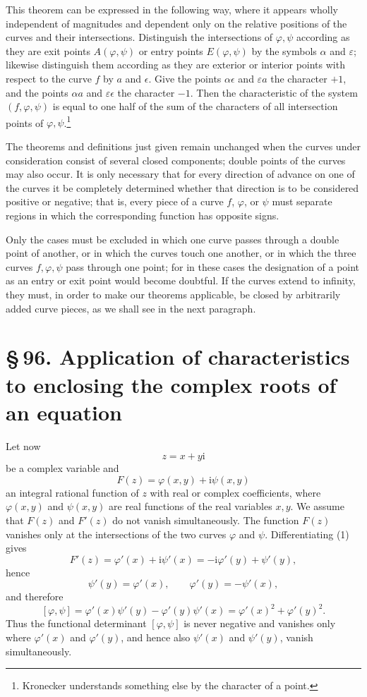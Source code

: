 \documentclass[11pt]{article}
\providecommand{\ii}{\mathrm{i}}
\providecommand{\sect}[2]{\section*{\S\,#1. #2}}
\begin{document}
This theorem can be expressed in the following way, where it appears wholly independent of magnitudes and dependent only on the relative positions of the curves and their intersections. Distinguish the intersections of $\varphi,\psi$ according as they are exit points $A(\varphi,\psi)$ or entry points $E(\varphi,\psi)$ by the symbols $\alpha$ and $\varepsilon$; likewise distinguish them according as they are exterior or interior points with respect to the curve $f$ by $a$ and $\epsilon$. Give the points $\alpha\epsilon$ and $\varepsilon a$ the character $+1$, and the points $\alpha a$ and $\varepsilon\epsilon$ the character $-1$. Then the characteristic of the system $(f,\varphi,\psi)$ is equal to one half of the sum of the characters of all intersection points of $\varphi,\psi$.\footnote{Kronecker understands something else by the character of a point.}

The theorems and definitions just given remain unchanged when the curves under consideration consist of several closed components; double points of the curves may also occur. It is only necessary that for every direction of advance on one of the curves it be completely determined whether that direction is to be considered positive or negative; that is, every piece of a curve $f$, $\varphi$, or $\psi$ must separate regions in which the corresponding function has opposite signs.

Only the cases must be excluded in which one curve passes through a double point of another, or in which the curves touch one another, or in which the three curves $f,\varphi,\psi$ pass through one point; for in these cases the designation of a point as an entry or exit point would become doubtful. If the curves extend to infinity, they must, in order to make our theorems applicable, be closed by arbitrarily added curve pieces, as we shall see in the next paragraph.

\sect{96}{Application of characteristics to enclosing the complex roots of an equation}

Let now
\[
        z=x+y\ii
\]
be a complex variable and
\begin{equation}
        F(z)=\varphi(x,y)+\ii\psi(x,y)
\tag{1}
\end{equation}
an integral rational function of $z$ with real or complex coefficients, where $\varphi(x,y)$ and $\psi(x,y)$ are real functions of the real variables $x,y$. We assume that $F(z)$ and $F'(z)$ do not vanish simultaneously. The function $F(z)$ vanishes only at the intersections of the two curves $\varphi$ and $\psi$. Differentiating (1) gives
\[
        F'(z)=\varphi'(x)+\ii\psi'(x)=-\ii\varphi'(y)+\psi'(y),
\]
hence
\[
        \psi'(y)=\varphi'(x),\qquad \varphi'(y)=-\psi'(x),
\]
and therefore
\[
        [\varphi,\psi]=\varphi'(x)\psi'(y)-\varphi'(y)\psi'(x)
        =\varphi'(x)^2+\varphi'(y)^2.
\]
Thus the functional determinant $[\varphi,\psi]$ is never negative and vanishes only where $\varphi'(x)$ and $\varphi'(y)$, and hence also $\psi'(x)$ and $\psi'(y)$, vanish simultaneously.
\end{document}
